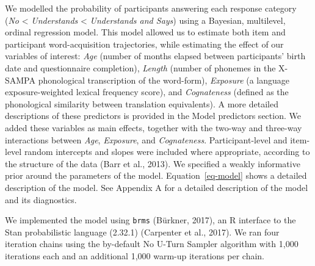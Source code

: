\documentclass[
  12pt,
  b5paperpaper,
  twoside]{scrreprt}
\begin{document}
We modelled the probability of participants answering each response
category (\emph{No} \textless{} \emph{Understands} \textless{}
\emph{Understands and Says}) using a Bayesian, multilevel, ordinal
regression model. This model allowed us to estimate both item and
participant word-acquisition trajectories, while estimating the effect
of our variables of interest: \emph{Age} (number of months elapsed
between participants' birth date and questionnaire completion),
\emph{Length} (number of phonemes in the X-SAMPA phonological
transcription of the word-form), \emph{Exposure} (a language
exposure-weighted lexical frequency score), and \emph{Cognateness}
(defined as the phonological similarity between translation
equivalents). A more detailed descriptions of these predictors is
provided in the Model predictors section. We added these variables as
main effects, together with the two-way and three-way interactions
between \emph{Age}, \emph{Exposure}, and \emph{Cognateness}.
Participant-level and item-level random intercepts and slopes were
included where appropriate, according to the structure of the data (Barr
et al., 2013). We specified a weakly informative prior around the
parameters of the model. Equation~\ref{eq-model} shows a detailed
description of the model. See Appendix A for a detailed description of
the model and its diagnostics.

We implemented the model using \texttt{brms} (Bürkner, 2017), an R
interface to the Stan probabilistic language (2.32.1) (Carpenter et al.,
2017). We ran four iteration chains using the by-default No U-Turn
Sampler algorithm with 1,000 iterations each and an additional 1,000
warm-up iterations per chain.
\end{document}
